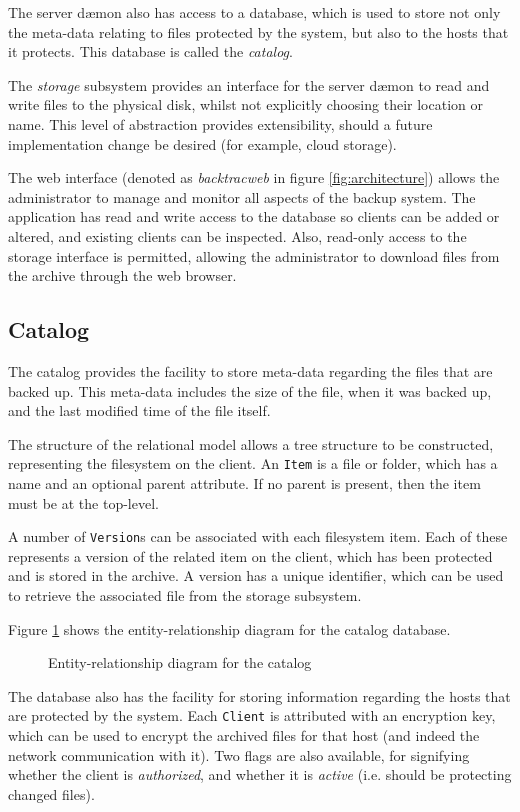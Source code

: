 The server d{\ae}mon also has access to a database, which is used to store not
only the meta-data relating to files protected by the system, but also to the
hosts that it protects. This database is called the \emph{catalog}.

The \emph{storage} subsystem provides an interface for the server d{\ae}mon to
read and write files to the physical disk, whilst not explicitly choosing their
location or name. This level of abstraction provides extensibility, should
a future implementation change be desired (for example, cloud storage).

The web interface (denoted as \emph{backtracweb} in figure
\ref{fig:architecture}) allows the administrator to manage and monitor all
aspects of the backup system. The application has read and write access to the
database so clients can be added or altered, and existing clients can be
inspected. Also, read-only access to the storage interface is permitted,
allowing the administrator to download files from the archive through the web
browser.

\subsection{Catalog}

The catalog provides the facility to store meta-data regarding the files that
are backed up. This meta-data includes the size of the file, when it was backed
up, and the last modified time of the file itself.

The structure of the relational model allows a tree structure to be
constructed, representing the filesystem on the client. An \verb!Item! is
a file or folder, which has a name and an optional parent attribute. If no
parent is present, then the item must be at the top-level.

A number of \verb!Version!s can be associated with each filesystem item. Each
of these represents a version of the related item on the client, which has been
protected and is stored in the archive. A version has a unique identifier,
which can be used to retrieve the associated file from the storage subsystem.

Figure \ref{fig:erd} shows the entity-relationship diagram for the catalog
database.

\begin{figure}
    \begin{center}
        
    \end{center}
    \caption{Entity-relationship diagram for the catalog}
    \label{fig:erd}
\end{figure}

The database also has the facility for storing information regarding the hosts
that are protected by the system. Each \verb!Client! is attributed with an
encryption key, which can be used to encrypt the archived files for that host
(and indeed the network communication with it). Two flags are also available,
for signifying whether the client is \emph{authorized}, and whether it is
\emph{active} (i.e. should be protecting changed files).
